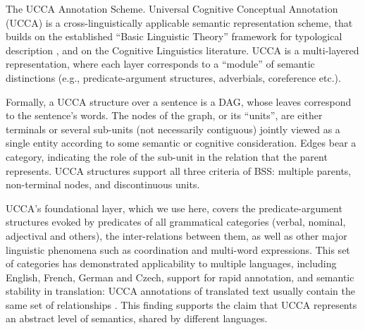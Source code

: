 \documentclass[11pt]{article}
\makeatletter
\renewcommand{\paragraph}{
  \@startsection{paragraph}{4}
  {\z@}{.5ex \@plus .5ex \@minus .2ex}{-1em}
  {\normalfont\normalsize\bfseries}
}
\makeatother
\begin{document}

\paragraph{The UCCA Annotation Scheme.}
Universal Cognitive Conceptual Annotation (UCCA)
is a cross-linguistically applicable semantic representation scheme,
that builds on the established ``Basic Linguistic Theory'' framework for typological description
\cite{Dixon:10b,Dixon:10a,Dixon:12}, and on the Cognitive Linguistics literature.
UCCA is a multi-layered representation, where each layer corresponds to a ``module'' of
semantic distinctions (e.g., predicate-argument structures, adverbials, coreference etc.).

Formally, a UCCA structure over a sentence is a DAG, whose leaves correspond to the sentence's words.
The nodes of the graph, or its ``units'', are either terminals or several
sub-units (not necessarily contiguous) jointly viewed as a
single entity according to some semantic or cognitive consideration.
Edges bear a category, indicating the role of the sub-unit in the relation that the parent represents.
UCCA structures support all three criteria of BSS: multiple parents, non-terminal nodes, and
discontinuous units.

UCCA's foundational layer, which we use here, covers the predicate-argument
structures evoked by predicates of all grammatical categories
(verbal, nominal, adjectival and others), the inter-relations between them,
as well as other major linguistic phenomena such as coordination and multi-word expressions.
This set of categories has demonstrated applicability to multiple languages, including
English, French, German and Czech, support for rapid annotation, and semantic stability in translation:
UCCA annotations of translated text usually contain the same set of relationships
\cite{sulem2015conceptual}. This finding supports the claim that UCCA represents an abstract
level of semantics, shared by different languages.
\end{document}

